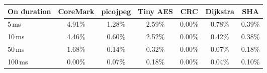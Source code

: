 \begin{tabular}{@{}l|cccccc@{}}
\toprule
\textbf{On duration} & \textbf{\textsf{CoreMark}} & \textbf{\textsf{picojpeg}} & \textbf{\textsf{Tiny AES}} & \textbf{\textsf{CRC}} & \textbf{\textsf{Dijkstra}} & \textbf{\textsf{SHA}} \\ \midrule
5\,ms & \colorbox{hightlight!24!white}{4.91\%} & \colorbox{hightlight!6!white}{1.28\%} & \colorbox{hightlight!12!white}{2.59\%} & \colorbox{hightlight!0!white}{0.00\%} & \colorbox{hightlight!3!white}{0.78\%} & \colorbox{hightlight!1!white}{0.39\%} \\
10\,ms & \colorbox{hightlight!22!white}{4.46\%} & \colorbox{hightlight!3!white}{0.60\%} & \colorbox{hightlight!12!white}{2.52\%} & \colorbox{hightlight!0!white}{0.00\%} & \colorbox{hightlight!2!white}{0.42\%} & \colorbox{hightlight!1!white}{0.38\%} \\
50\,ms & \colorbox{hightlight!8!white}{1.68\%} & \colorbox{hightlight!0!white}{0.14\%} & \colorbox{hightlight!1!white}{0.32\%} & \colorbox{hightlight!0!white}{0.00\%} & \colorbox{hightlight!0!white}{0.07\%} & \colorbox{hightlight!0!white}{0.18\%} \\
100\,ms & \colorbox{hightlight!0!white}{0.00\%} & \colorbox{hightlight!0!white}{0.07\%} & \colorbox{hightlight!0!white}{0.18\%} & \colorbox{hightlight!0!white}{0.00\%} & \colorbox{hightlight!0!white}{0.04\%} & \colorbox{hightlight!0!white}{0.10\%} \\
 \bottomrule
\end{tabular}
